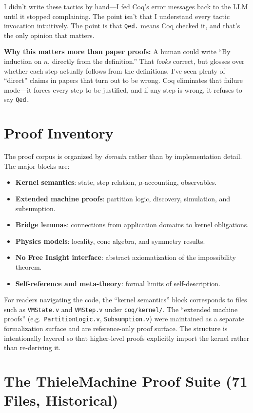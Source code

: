 I didn't write these tactics by hand---I fed Coq's error messages back to the LLM until it stopped complaining. The point isn't that I understand every tactic invocation intuitively. The point is that \texttt{Qed.} means Coq checked it, and that's the only opinion that matters.

\textbf{Why this matters more than paper proofs:} A human could write ``By induction on $n$, directly from the definition.'' That \textit{looks} correct, but glosses over whether each step actually follows from the definitions. I've seen plenty of ``direct'' claims in papers that turn out to be wrong. Coq eliminates that failure mode---it forces every step to be justified, and if any step is wrong, it refuses to say \texttt{Qed.}

\section{Proof Inventory}

The proof corpus is organized by \emph{domain} rather than by implementation detail. The major blocks are:
\begin{itemize}
    \item \textbf{Kernel semantics}: state, step relation, $\mu$-accounting, observables.
    \item \textbf{Extended machine proofs}: partition logic, discovery, simulation, and subsumption.
    \item \textbf{Bridge lemmas}: connections from application domains to kernel obligations.
    \item \textbf{Physics models}: locality, cone algebra, and symmetry results.
    \item \textbf{No Free Insight interface}: abstract axiomatization of the impossibility theorem.
    \item \textbf{Self-reference and meta-theory}: formal limits of self-description.
\end{itemize}
For readers navigating the code, the ``kernel semantics'' block corresponds to files such as \texttt{VMState.v} and \texttt{VMStep.v} under \texttt{coq/kernel/}. The ``extended machine proofs'' (e.g.\ \texttt{PartitionLogic.v}, \texttt{Subsumption.v}) were maintained as a separate formalization surface and are reference-only proof surface. The structure is intentionally layered so that higher-level proofs explicitly import the kernel rather than re-deriving it.

\section{The ThieleMachine Proof Suite (71 Files, Historical)}

